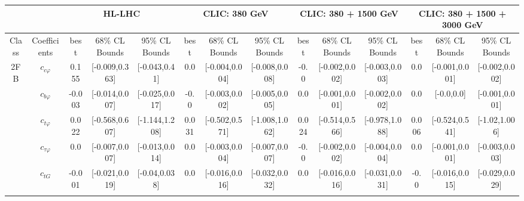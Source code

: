 \documentclass{article}
\begin{document}
\begin{table}[H]
\centering
\begin{tabular}{|c|c|c|c|c|c|c|c|c|c|c|c|c|c|}
\hline
 &  & \multicolumn{3}{c|}{HL-LHC} & \multicolumn{3}{c|}{CLIC: 380 GeV} & \multicolumn{3}{c|}{CLIC: 380 + 1500 GeV} & \multicolumn{3}{c|}{CLIC: 380 + 1500 + 3000 GeV} \\ \hline
Class & Coefficients & best & 68\% CL Bounds & 95\% CL Bounds & best & 68\% CL Bounds & 95\% CL Bounds & best & 68\% CL Bounds & 95\% CL Bounds & best & 68\% CL Bounds & 95\% CL Bounds\\ \hline
\multirow{23}{*}{2FB}
 & $c_{c \varphi}$ & 0.155                             & [-0.009,0.363]                                 & [-0.043,0.41] & 0.0                             & [-0.004,0.004]                                 & [-0.008,0.008] & -0.0                             & [-0.002,0.002]                                 & [-0.003,0.003] & 0.0                             & [-0.001,0.001]                                 & [-0.002,0.002] \\ \cline{2-14}
 & $c_{b \varphi}$ & -0.003                             & [-0.014,0.007]                                 & [-0.025,0.017] & -0.0                             & [-0.003,0.002]                                 & [-0.005,0.005] & 0.0                             & [-0.001,0.001]                                 & [-0.002,0.002] & 0.0                             & [-0.0,0.0]                                 & [-0.001,0.001] \\ \cline{2-14}
 & $c_{t \varphi}$ & 0.022                             & [-0.568,0.607]                                 & [-1.144,1.208] & 0.031                             & [-0.502,0.571]                                 & [-1.008,1.062] & 0.024                             & [-0.514,0.566]                                 & [-0.978,1.088] & 0.006                             & [-0.524,0.541]                                 & [-1.02,1.006] \\ \cline{2-14}
 & $c_{\tau \varphi}$ & 0.0                             & [-0.007,0.007]                                 & [-0.013,0.014] & 0.0                             & [-0.003,0.004]                                 & [-0.007,0.007] & -0.0                             & [-0.002,0.002]                                 & [-0.004,0.004] & 0.0                             & [-0.001,0.001]                                 & [-0.003,0.003] \\ \cline{2-14}
 & $c_{tG}$ & -0.001                             & [-0.021,0.019]                                 & [-0.04,0.038] & 0.0                             & [-0.016,0.016]                                 & [-0.032,0.032] & 0.0                             & [-0.016,0.016]                                 & [-0.031,0.031] & -0.0                             & [-0.016,0.015]                                 & [-0.029,0.029] \\ \cline{2-14}

\end{tabular}
\end{table}
\end{document}
